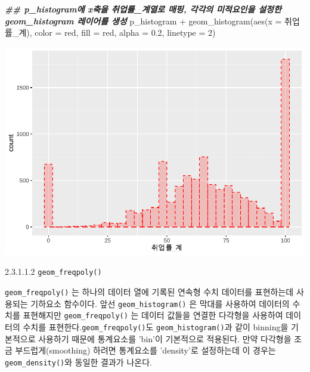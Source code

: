 \documentclass[
]{article}
\newenvironment{Shaded}{\begin{snugshade}}{\end{snugshade}}
\newcommand{\AttributeTok}[1]{\textcolor[rgb]{0.77,0.63,0.00}{#1}}
\newcommand{\DecValTok}[1]{\textcolor[rgb]{0.00,0.00,0.81}{#1}}
\newcommand{\DocumentationTok}[1]{\textcolor[rgb]{0.56,0.35,0.01}{\textbf{\textit{#1}}}}
\newcommand{\FloatTok}[1]{\textcolor[rgb]{0.00,0.00,0.81}{#1}}
\newcommand{\FunctionTok}[1]{\textcolor[rgb]{0.00,0.00,0.00}{#1}}
\newcommand{\NormalTok}[1]{#1}
\newcommand{\SpecialCharTok}[1]{\textcolor[rgb]{0.00,0.00,0.00}{#1}}
\newcommand{\StringTok}[1]{\textcolor[rgb]{0.31,0.60,0.02}{#1}}
\begin{document}
\begin{Shaded}
\begin{Highlighting}[]
\DocumentationTok{\#\# p\_histogram에 x축을 \textquotesingle{}취업률\_계\textquotesingle{}열로 매핑, 각각의 미적요인을 설정한  geom\_histogram 레이어를 생성 }
\NormalTok{p\_histogram }\SpecialCharTok{+} 
  \FunctionTok{geom\_histogram}\NormalTok{(}\FunctionTok{aes}\NormalTok{(}\AttributeTok{x =}\NormalTok{ 취업률\_계), }\AttributeTok{color =} \StringTok{\textquotesingle{}red\textquotesingle{}}\NormalTok{, }\AttributeTok{fill =} \StringTok{\textquotesingle{}red\textquotesingle{}}\NormalTok{, }\AttributeTok{alpha =} \FloatTok{0.2}\NormalTok{, }\AttributeTok{linetype =} \DecValTok{2}\NormalTok{)}
\end{Highlighting}
\end{Shaded}

\includegraphics{chap3_files/figure-latex/unnamed-chunk-20-5.pdf}

2.3.1.1.2 \texttt{geom\_freqpoly()}

\texttt{geom\_freqpoly()} 는 하나의 데이터 열에 기록된 연속형 수치 데이터를 표현하는데 사용되는 기하요소 함수이다. 앞선 \texttt{geom\_histogram()} 은 막대를 사용하여 데이터의 수치를 표현해지만 \texttt{geom\_freqpoly()} 는 데이터 값들을 연결한 다각형을 사용하여 데이터의 수치를 표현한다.\texttt{geom\_freqpoly()}도 \texttt{geom\_histogram()}과 같이 binning을 기본적으로 사용하기 때문에 통계요소를 'bin'이 기본적으로 적용된다. 만약 다각형을 조금 부드럽게(smoothing) 하려면 통계요소를 'density'로 설정하는데 이 경우는 \texttt{geom\_density()}와 동일한 결과가 나온다.
\end{document}
